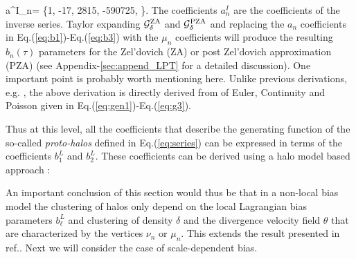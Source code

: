 {a^I_n}= \left \{1, -{17}, {2815}, -{590725}, \cdots \right \}.
\een
The coefficients ${a^I_n}$ are the coefficients of the inverse series.
Taylor expanding ${\cal G}_{\delta}^{\rm ZA}$ and  ${\cal G}_{\delta}^{\rm PZA}$ 
and replacing the $a_n$ coefficients in Eq.(\ref{eq:b1})-Eq.(\ref{eq:b3})
with the $\mu_n$ coefficients will produce the resulting $b_n(\tau)$ parameters for the Zel'dovich (ZA) or post Zel'dovich approximation (PZA)
(see Appendix-\ref{sec:append_LPT} for a detailed discussion).  
One important point is probably worth mentioning here. Unlike previous derivations, e.g. \citep{HJM1,HM},
the above derivation is directly derived from
of Euler, Continuity and Poisson given in Eq.(\ref{eq:gen1})-Eq.(\ref{eq:g3}).

Thus at this level, all the coefficients that describe the generating function of the so-called {\em proto-halos} 
defined in Eq.(\ref{eq:series}) can be expressed in terms of the coefficients 
$b_1^L$ and $b_2^L$. These coefficients can be derived using a halo model based approach \citep{Saito}:

An important conclusion of this section would thus be that in a non-local bias model the
clustering of halos only depend on the local Lagrangian bias parameters $b^L_{\ell}$ and clustering
of density $\delta$  and the divergence velocity field $\theta$ 
that are characterized by the
vertices $\nu_n$ or $\mu_n$. 
This extends the result presented in ref.\citep{Munshi_IBIT}.
Next we will consider the case of scale-dependent bias.
%   
%
%
%
%
%
%
